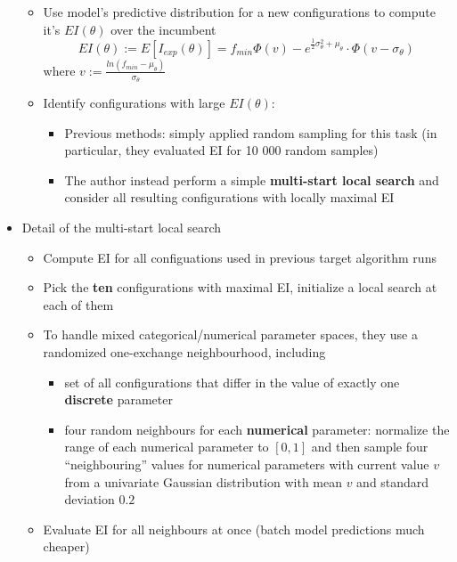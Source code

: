 \documentclass[10pt]{article}
\theoremstyle{definition}
\newcommand{\half}[0]{\frac{1}{2}}
\begin{document}
\begin{itemize}
\begin{itemize}
            \item Use model’s predictive distribution for a new configurations to compute it's $EI(\theta)$ over the incumbent
                \begin{equation*}
                    EI(\theta) := E[I_{exp}(\theta)] = f_{min} \Phi(v) - e^{\half \sigma_{\theta}^2 + \mu_{\theta}} \cdot \Phi(v - \sigma_{\theta})
                \end{equation*}
                where $v := \frac{ln(f_{min} - \mu_{\theta})}{\sigma_{\theta}}$
            \item Identify configurations with large $EI(\theta)$:
                \begin{itemize}
                    \item Previous methods: simply applied random sampling for this task  
                    (in particular, they evaluated EI for 10 000 random samples)
                    \item The author instead perform a simple {\bf multi-start local search} and consider all resulting configurations with locally maximal EI
                \end{itemize}
        \end{itemize}
    \item Detail of the multi-start local search
    \begin{itemize}
        \item Compute EI for all configuations used in previous target algorithm runs
        \item Pick the {\bf ten} configurations with maximal EI, initialize a local search at each of them
        \item To handle mixed categorical/numerical parameter spaces, they use a randomized one-exchange neighbourhood, including
        \begin{itemize}
            \item set of all configurations that differ in the value of exactly one {\bf discrete} parameter
            \item four random neighbours for each {\bf numerical} parameter: normalize the range of each numerical parameter 
            to $[0,1]$ and then sample four “neighbouring” values for numerical parameters with current value $v$ from
            a univariate Gaussian distribution with mean $v$ and standard deviation $0.2$
        \end{itemize}
        \item Evaluate EI for all neighbours at once (batch model predictions much cheaper)

\end{itemize}
\end{itemize}
\end{document}
